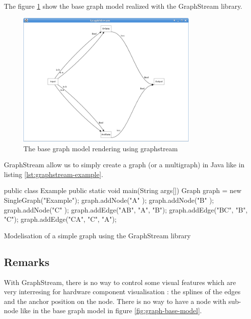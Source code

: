 The figure \ref{fig:base-graph-model-graphstream} show the base graph model realized with the GraphStream library.

\begin{figure}[h]
  \centering
  \includegraphics[width=0.8\textwidth]{img/graphstream-base-model-example}
  \caption{The base graph model rendering using graphstream}
  \label{fig:base-graph-model-graphstream}
\end{figure}

GraphStream allow us to simply create a graph (or a multigraph) in Java like in listing \ref{lst:graphstream-example}.

\begin{listing}[p]
  \centering
  \begin{javacode}
    public class Example
    {
      public static void main(String args[])
      {
        Graph graph = new SingleGraph("Example");
        graph.addNode("A" );
        graph.addNode("B" );
        graph.addNode("C" );
        graph.addEdge("AB", "A", "B");
        graph.addEdge("BC", "B", "C");
        graph.addEdge("CA", "C", "A");
      }
    }
  \end{javacode}
  \caption[A simple graph modelisation using GraphStream]{Modelisation of a simple graph using the GraphStream library}
  \label{lst:graphstream-example}
\end{listing}


\subsection{Remarks}
\label{sub:Remarks}

With GraphStream, there is no way to control some visual features which are very interresing for hardware component visualisation :
the splines of the edges and the anchor position on the node.
There is no way to have a node with sub-node like in the base graph model in figure \ref{fig:graph-base-model}.

